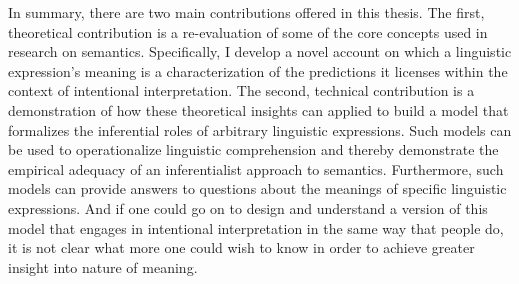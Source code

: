 In summary, there are two main contributions offered in this thesis. The first, theoretical contribution is a re-evaluation of some of the core concepts used in research on semantics. Specifically, I develop a novel account on which a linguistic expression's meaning is a characterization of the predictions it licenses within the context of intentional interpretation. The second, technical contribution is a demonstration of how these theoretical insights can applied to build a model that formalizes the inferential roles of arbitrary linguistic expressions. Such models can be used to operationalize linguistic comprehension and thereby demonstrate the empirical adequacy of an inferentialist approach to semantics. Furthermore, such models can provide answers to questions about the meanings of specific linguistic expressions. And if one could go on to design and understand a version of this model that engages in intentional interpretation in the same way that people do, it is not clear what more one could wish to know in order to achieve greater insight into nature of meaning.
